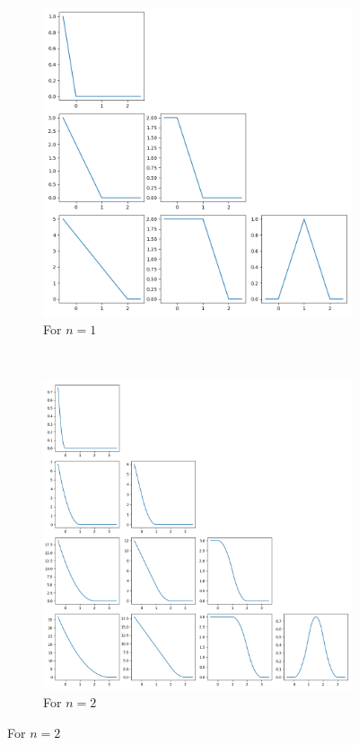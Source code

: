 \documentclass[a4paper]{article}
\begin{document}
\begin{figure}[H]
    \centering
    \begin{subfigure}[b]{0.5\textwidth}
        \centering
        \includegraphics[width=\textwidth]{../figure/F_1.png}
        \caption{For $n=1$}
    \end{subfigure}
    \\
    \begin{subfigure}[b]{0.5\textwidth}
        \centering
        \includegraphics[width=\textwidth]{../figure/F_2.png}
        \caption{For $n=2$}
    \end{subfigure}
\end{figure}
\end{document}
